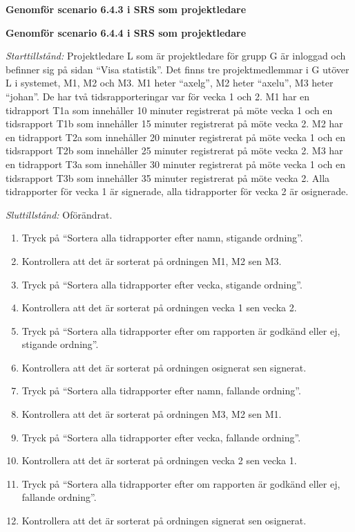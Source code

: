 \documentclass[a4paper]{article}
\begin{document}
\begin{ST}
\item
\textbf{Genomför scenario 6.4.3 i SRS som projektledare}

\item
\textbf{Genomför scenario 6.4.4 i SRS som projektledare}

\emph{Starttillstånd:} Projektledare L som är projektledare för grupp G är inloggad och befinner sig på sidan ``Visa statistik''. Det finns tre projektmedlemmar i G utöver L i systemet, M1, M2 och M3. M1 heter ``axelg'', M2 heter ``axelu'', M3 heter ``johan''. De har två tidsrapporteringar var för vecka 1 och 2. M1 har en tidrapport T1a som innehåller 10 minuter registrerat på möte vecka 1 och en tidsrapport T1b som innehåller 15 minuter registrerat på möte vecka 2. M2 har en tidrapport T2a som innehåller 20 minuter registrerat på möte vecka 1 och en tidsrapport T2b som innehåller 25 minuter registrerat på möte vecka 2. M3 har en tidrapport T3a som innehåller 30 minuter registrerat på möte vecka 1 och en tidsrapport T3b som innehåller 35 minuter registrerat på möte vecka 2. Alla tidrapporter för vecka 1 är signerade, alla tidrapporter för vecka 2 är osignerade.

\emph{Sluttillstånd:} Oförändrat.

\begin{enumerate}
\item Tryck på ``Sortera alla tidrapporter efter namn, stigande ordning''.
\item Kontrollera att det är sorterat på ordningen M1, M2 sen M3.
\item Tryck på ``Sortera alla tidrapporter efter vecka, stigande ordning''.
\item Kontrollera att det är sorterat på ordningen vecka 1 sen vecka 2.
\item Tryck på ``Sortera alla tidrapporter efter om rapporten är godkänd eller ej, stigande ordning''.
\item Kontrollera att det är sorterat på ordningen osignerat sen signerat.
\item Tryck på ``Sortera alla tidrapporter efter namn, fallande ordning''.
\item Kontrollera att det är sorterat på ordningen M3, M2 sen M1.
\item Tryck på ``Sortera alla tidrapporter efter vecka, fallande ordning''.
\item Kontrollera att det är sorterat på ordningen vecka 2 sen vecka 1.
\item Tryck på ``Sortera alla tidrapporter efter om rapporten är godkänd eller ej, fallande ordning''.
\item Kontrollera att det är sorterat på ordningen signerat sen osignerat.
\end{enumerate}

\end{ST}
\end{document}
